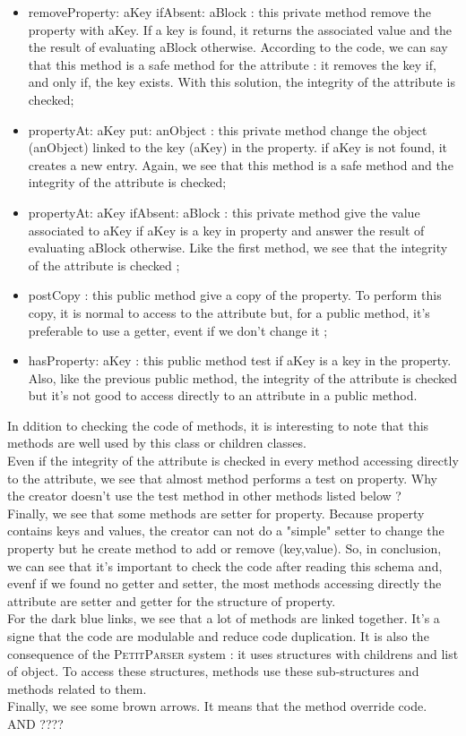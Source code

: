 \begin{itemize}
	\item removeProperty: aKey ifAbsent: aBlock : this private method 	remove the property with aKey.  If a key is found, it returns the associated value and the the result of evaluating aBlock otherwise.  According to the code, we can say that this method is a safe method for the attribute : it removes the key if, and only if, the key exists.  With this solution, the integrity of the attribute is checked;
	\item propertyAt: aKey put: anObject : this private method change the object (anObject) linked to the key (aKey) in the property.  if aKey is not found, it creates a new entry.  Again, we see that this method is a safe method and the integrity of the attribute is checked;
	\item propertyAt: aKey ifAbsent: aBlock : this private method give the value associated to aKey if aKey is a key in property and answer the result of evaluating aBlock otherwise.  Like the first method, we see that the integrity of the attribute is checked ;
	\item postCopy : this public method give a copy of the property.  To perform this copy, it is normal to access to the attribute but, for a public method, it's preferable to use a getter, event if we don't change it ;
	\item hasProperty: aKey : this public method test if aKey is a key in the property.  Also, like the previous public method, the integrity of the attribute is checked but it's not good to access directly to an attribute in a public method.
\end{itemize}
In ddition to checking the code of methods, it is interesting to note that this methods are well used by this class or children classes.\\
Even if the integrity of the attribute is checked in every method accessing directly to the attribute, we see that almost method performs a test on property.  Why the creator doesn't use the test method in other methods listed below ? \\
Finally, we see that some methods are setter for property.  Because property contains keys and values, the creator can not do a "simple" setter to change the property but he create method to add or remove (key,value).  So, in conclusion, we can see that it's important to check the code after reading this schema and, evenf if we found no getter and setter, the most methods accessing directly the attribute are setter and getter for the structure of property.\\
For the dark blue links, we see that a lot of methods are linked together.  It's a signe that the code are modulable and reduce code duplication.  It is also the consequence of the \textsc{PetitParser} system : it uses structures with childrens and list of object.  To access these structures,  methods use these sub-structures and methods related to them.\\
Finally, we see some brown arrows.  It means that the method override code.  AND ???? \\

